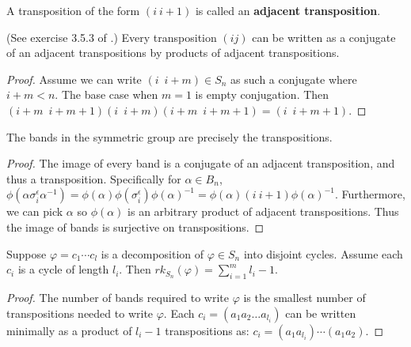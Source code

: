 \documentclass[12pt]{thesis}
\begin{document}
\begin{definition}
    A transposition of the form $(i\ i+1)$ is called an \textbf{adjacent transposition}.
\end{definition}

\begin{lemma}
    (See exercise 3.5.3 of \cite{dummit-and-foote}.)
    Every transposition $(i j)$ can be written
    as a conjugate of an adjacent transpositions
    by products of adjacent transpositions. 
\end{lemma}

\begin{proof}
    Assume we can write $(i\enspace  i + m) \in S_{n}$ as such a conjugate where $i + m < n$.
    The base case when $m = 1$ is empty conjugation.
    Then $(i + m\enspace i + m + 1) (i\enspace i + m) (i + m\enspace i + m + 1) = (i\enspace i + m + 1)$.
\end{proof}

\begin{proposition}
    \label{prop:bands-are-transpositions}
    The bands in the symmetric group are precisely the transpositions.
\end{proposition}

\begin{proof}
    The image of every band
    is a conjugate of an adjacent transposition,
    and thus a transposition.
    Specifically for $\alpha \in B_{n}$,
    $\phi(\alpha\sigma_{i}^{\epsilon}\alpha^{-1}) = \phi(\alpha)\phi(\sigma_{i}^{\epsilon})\phi(\alpha)^{-1} = \phi(\alpha) (i\ i+1) \phi(\alpha)^{-1}$.
    Furthermore, we can pick $\alpha$ so $\phi(\alpha)$ is an arbitrary
    product of adjacent transpositions.
    Thus the image of bands is surjective on transpositions.
\end{proof}

\begin{proposition}
    Suppose $\varphi = c_{1} \cdots c_{l}$ is a decomposition
    of $\varphi \in S_{n}$ into disjoint cycles.
    Assume each $c_{i}$ is a cycle of length $l_{i}$.
    Then $rk_{S_{n}}(\varphi) = \sum_{i=1}^{m} l_{i} - 1$.
\end{proposition}

\begin{proof}
    The number of bands required to write $\varphi$
    is the smallest number of transpositions needed
    to write $\varphi$.
    Each $c_{i} = (a_{1} a_{2} \ldots a_{l_{i}})$ can be written
    minimally as a product of $l_{i} - 1$  transpositions
    as: $c_{i} = (a_{1}a_{l_{i}}) \cdots (a_{1} a_{2})$.
\end{proof}
\end{document}
